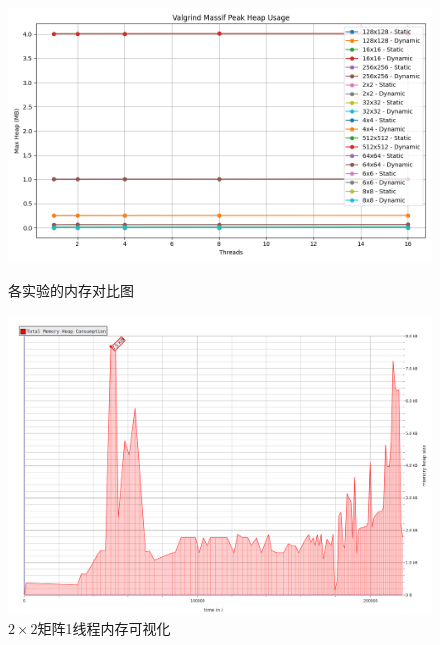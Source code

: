 \documentclass[a4paper, utf8]{ctexart}
\begin{document}
	\begin{figure}[htbp]
		\centering
		\begin{minipage}{.45\textwidth}
			\centering
			\includegraphics[width=.9\textwidth]{./figure/valgrind_memory_plot.png}
			\caption{各实验的内存对比图}
		\end{minipage}
		\begin{minipage}{.45\textwidth}
			\centering
			\includegraphics[width=.8\textwidth]{./figure/valgrind_visualize_2_1.png}
			\caption{$2\times2$矩阵1线程内存可视化}
		\end{minipage}
		

\end{figure}
\end{document}
